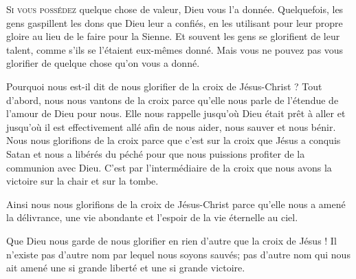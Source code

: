 \dvrule






\lettrine{S}{i vous possédez} quelque chose de valeur,
 Dieu vous l'a donnée. Quelquefois, les gens gaspillent les dons que Dieu
 leur a confiés, en les utilisant pour leur propre gloire au lieu
 de le faire pour la Sienne. Et souvent les gens se glorifient
 de leur talent, comme s'ils se l'étaient eux-mêmes donné.
 Mais vous ne pouvez pas vous glorifier de quelque chose qu'on vous a donné. 


Pourquoi nous est-il dit de nous glorifier de la croix de Jésus-Christ ?
 Tout d'abord, nous nous vantons de la croix parce qu'elle nous parle
 de l'étendue de l'amour de Dieu pour nous. Elle nous rappelle jusqu'où Dieu
 était prêt à aller \ocadr et jusqu'où il est effectivement allé \fcadr{}
 afin de nous aider, nous sauver et nous bénir.
 Nous nous glorifions de la croix parce que c'est sur la croix que Jésus
 a conquis Satan et nous a libérés du péché pour que nous puissions
 profiter de la communion avec Dieu. C'est par l'intermédiaire de la croix
 que nous avons la victoire sur la chair et sur la tombe.

Ainsi nous nous glorifions de la croix de Jésus-Christ
 parce qu'elle nous a amené la délivrance, une vie abondante et l'espoir
 de la vie éternelle au ciel.

Que Dieu nous garde de nous glorifier en rien d'autre que la croix de Jésus !
 Il n'existe pas d'autre nom par lequel nous soyons sauvés;
 pas d'autre nom qui nous ait amené une si grande liberté
 et une si grande victoire.

\dvrule




